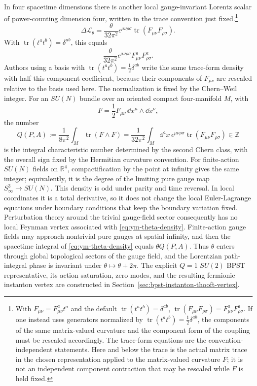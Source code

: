 In four spacetime dimensions there is another local gauge-invariant Lorentz
scalar of power-counting dimension four, written in the trace convention just
fixed.\footnote{With \(F_{\mu\nu}=F^a_{\mu\nu}t^a\) and the default
\(\operatorname{tr}(t^at^b)=\delta^{ab}\),
\(\operatorname{tr}(F_{\mu\nu}F_{\rho\sigma})
=F^a_{\mu\nu}F^a_{\rho\sigma}\).  If one instead uses generators normalized by
\(\operatorname{tr}(t^at^b)=\frac12\delta^{ab}\), the components of the same
matrix-valued curvature and the component form of the coupling must be rescaled
accordingly.  The trace-form equations are the convention-independent
statements.  Here and below the trace is the actual matrix trace in the chosen
representation applied to the matrix-valued curvature \(F\); it is not an
independent component contraction that may be rescaled while \(F\) is held
fixed.}
\begin{equation}
  \Delta\mathcal L_\theta
  =
  \frac{\theta}{32\pi^2}
  \epsilon^{\mu\nu\rho\sigma}
  \operatorname{tr}(F_{\mu\nu}F_{\rho\sigma}).
  \label{eq:ym-theta-density}
\end{equation}
With \(\operatorname{tr}(t^at^b)=\delta^{ab}\), this equals
\[
  \frac{\theta}{32\pi^2}
  \epsilon^{\mu\nu\rho\sigma}F^a_{\mu\nu}F^a_{\rho\sigma}.
\]
Authors using a basis with
\(\operatorname{tr}(t^at^b)=\frac12\delta^{ab}\) write the same trace-form
density with half this component coefficient, because their components of
\(F_{\mu\nu}\) are rescaled relative to the basis used here.
The normalization is fixed by the Chern--Weil integer.  For an \(SU(N)\)
bundle over an oriented compact four-manifold \(M\), with
\[
  F=\frac12F_{\mu\nu}\,\dd x^\mu\wedge\dd x^\nu,
\]
the number
\begin{equation}
  Q(P,A)
  :=
  \frac1{8\pi^2}\int_M\operatorname{tr}(F\wedge F)
  =
  \frac1{32\pi^2}
  \int_M\dd^4x\,
  \epsilon^{\mu\nu\rho\sigma}
  \operatorname{tr}(F_{\mu\nu}F_{\rho\sigma})
  \in\mathbb Z
  \label{eq:ym-theta-instanton-number}
\end{equation}
is the integral characteristic number determined by the second Chern class,
with the overall sign fixed by the Hermitian curvature convention.  For
finite-action \(SU(N)\) fields on \(\mathbb R^4\), compactification by the
point at infinity gives the same integer; equivalently, it is the degree of
the limiting pure gauge map \(S^3_\infty\to SU(N)\).
This density is odd under parity and time reversal.  In local coordinates it
is a total derivative, so it does not change the local Euler-Lagrange equations
under boundary conditions that keep the boundary variation fixed.  Perturbation
theory around the trivial gauge-field sector consequently has no local Feynman
vertex associated with \eqref{eq:ym-theta-density}.  Finite-action gauge fields
may approach nontrivial pure gauges at spatial infinity, and then the spacetime
integral of \eqref{eq:ym-theta-density} equals \(\theta Q(P,A)\).  Thus
\(\theta\) enters through global topological sectors of the gauge field, and
the Lorentzian path-integral phase is invariant under
\(\theta\mapsto\theta+2\pi\).  The explicit \(Q=1\) \(SU(2)\) BPST
representative, its action saturation, zero modes, and the resulting
fermionic instanton vertex are constructed in
Section~\ref{sec:bpst-instanton-thooft-vertex}.

